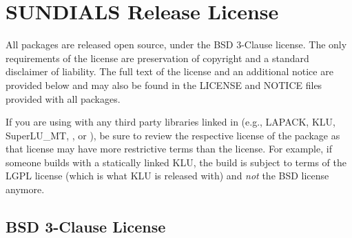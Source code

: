 \section{SUNDIALS Release License}

All {\sundials} packages are released open source, under the BSD 3-Clause
license. The only requirements of the license are preservation of copyright and
a standard disclaimer of liability. The full text of the license and an
additional notice are provided below and may also be found in the LICENSE and
NOTICE files provided with all {\sundials} packages.

{\warn} If you are using {\sundials} with any third
party libraries linked in (e.g., LAPACK, KLU, SuperLU\_MT, {\petsc},
or {\hypre}), be sure to review the respective license of the package as
that license may have more restrictive terms than the {\sundials} license.
For example, if someone builds {\sundials} with a statically linked KLU,
the build is subject to terms of the LGPL license (which is what
KLU is released with) and \textit{not} the {\sundials} BSD license anymore.

\subsection{BSD 3-Clause License}

